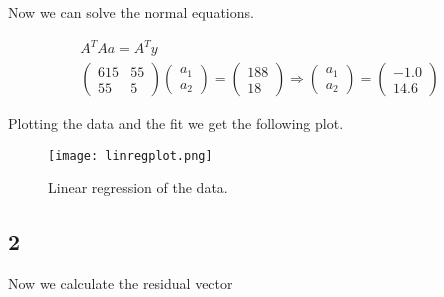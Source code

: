 \documentclass[a4paper]{article}
\begin{document}
Now we can solve the normal equations.

\begin{align*}
    A^TAa = A^Ty\\
    \begin{pmatrix}
        615 & 55\\
        55 & 5
    \end{pmatrix} \begin{pmatrix}
        a_1\\
        a_2
    \end{pmatrix} = \begin{pmatrix}
        188\\
        18
    \end{pmatrix} \Rightarrow \begin{pmatrix}
        a_1\\
        a_2
    \end{pmatrix} = \begin{pmatrix}
        -1.0\\
        14.6
    \end{pmatrix}
\end{align*}

Plotting the data and the fit we get the following plot.

\begin{figure}[H]
    \begin{small}
        \begin{center}
            \texttt{[image: linregplot.png]}
        \end{center}
        \caption{Linear regression of the data.}
        \label{fig:linreg}
    \end{small}
\end{figure}

\subsection*{2}
Now we calculate the residual vector
\end{document}
